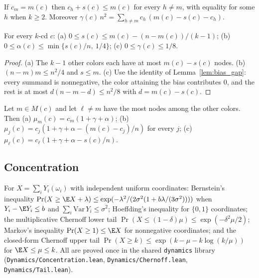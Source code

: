 \begin{lemma}\label{lem:bias_gap}
  \leanok
  If $c_m = m(c)$ then $c_h + s(c) \le m(c)$ for every $h \ne m$, with
  equality for some $h$ when $k \ge 2$. Moreover
  $\gamma(c)\,n^2 = \sum_{h \ne m} c_h\,(m(c) - s(c) - c_h)$.
\end{lemma}

\begin{lemma}[Lemma 3.1]\label{lem:3_1}
  \leanok
  For every $k$-cd $c$:
  (a) $0 \le s(c) \le m(c) - (n - m(c))/(k-1)$;
  (b) $0 \le \alpha(c) \le \min\{s(c)/n,\ 1/4\}$;
  (c) $0 \le \gamma(c) \le 1/8$.
\end{lemma}

\begin{proof}
  (a) The $k-1$ other colors each have at most $m(c) - s(c)$ nodes.
  (b) $(n - m)m \le n^2/4$ and $s \le m$.
  (c) Use the identity of Lemma~\ref{lem:bias_gap}: every summand is
  nonnegative, the color attaining the bias contributes $0$, and the rest is
  at most $d(n - m - d) \le n^2/8$ with $d = m(c) - s(c)$.
\end{proof}

\begin{lemma}[Lemma 3.2]\label{lem:3_2}
  \leanok
  Let $m \in M(c)$ and let $\ell \ne m$ have the most nodes among the other
  colors. Then (a) $\mu_m(c) = c_m(1 + \gamma + \alpha)$;
  (b) $\mu_j(c) = c_j(1 + \gamma + \alpha - (m(c) - c_j)/n)$ for every $j$;
  (c) $\mu_\ell(c) = c_\ell(1 + \gamma + \alpha - s(c)/n)$.
\end{lemma}

\subsection{Concentration}

\begin{lemma}\label{lem:tails}
  \leanok
  For $X = \sum_i Y_i(\omega_i)$ with independent uniform coordinates:
  Bernstein's inequality
  $\Pr(X \ge \E X + \lambda) \le \exp(-\lambda^2/(2\sigma^2(1 + b\lambda/(3\sigma^2))))$
  when $Y_i - \E Y_i \le b$ and $\sum_i \mathrm{Var}\,Y_i \le \sigma^2$;
  Hoeffding's inequality for $\{0,1\}$ coordinates; the multiplicative
  Chernoff lower tail $\Pr(X \le (1-\delta)\mu) \le \exp(-\delta^2\mu/2)$;
  Markov's inequality $\Pr(X \ge 1) \le \E X$ for nonnegative coordinates;
  and the closed-form Chernoff upper tail
  $\Pr(X \ge k) \le \exp(k - \mu - k\log(k/\mu))$ for $\E X \le \mu \le k$.
  All are proved once in the shared \texttt{dynamics} library
  (\texttt{Dynamics/Concentration.lean}, \texttt{Dynamics/Chernoff.lean},
  \texttt{Dynamics/Tail.lean}).
\end{lemma}

